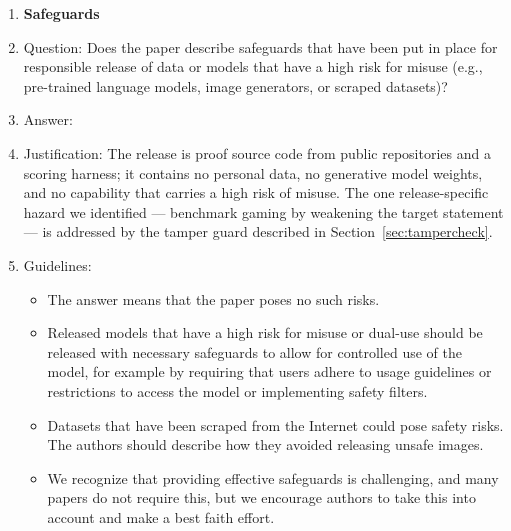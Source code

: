 \begin{enumerate}
\item {\bf Safeguards}
    \item[] Question: Does the paper describe safeguards that have been put in place for responsible release of data or models that have a high risk for misuse (e.g., pre-trained language models, image generators, or scraped datasets)?
    \item[] Answer: \answerNA{}
    \item[] Justification: The release is proof source code from public repositories and a scoring harness; it contains no personal data, no generative model weights, and no capability that carries a high risk of misuse. The one release-specific hazard we identified --- benchmark gaming by weakening the target statement --- is addressed by the tamper guard described in Section~\ref{sec:tampercheck}.
    \item[] Guidelines:
    \begin{itemize}
        \item The answer \answerNA{} means that the paper poses no such risks.
        \item Released models that have a high risk for misuse or dual-use should be released with necessary safeguards to allow for controlled use of the model, for example by requiring that users adhere to usage guidelines or restrictions to access the model or implementing safety filters. 
        \item Datasets that have been scraped from the Internet could pose safety risks. The authors should describe how they avoided releasing unsafe images.
        \item We recognize that providing effective safeguards is challenging, and many papers do not require this, but we encourage authors to take this into account and make a best faith effort.
    \end{itemize}


\end{enumerate}
